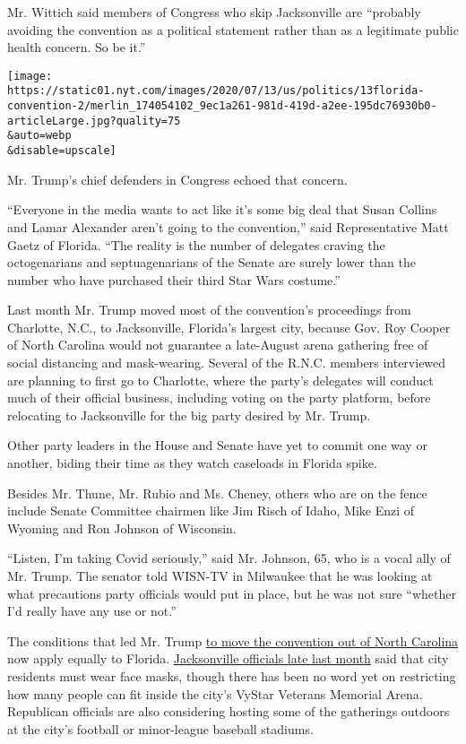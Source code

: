 Mr. Wittich said members of Congress who skip Jacksonville are
``probably avoiding the convention as a political statement rather than
as a legitimate public health concern. So be it.''

\texttt{[image: https://static01.nyt.com/images/2020/07/13/us/politics/13florida-convention-2/merlin\_174054102\_9ec1a261-981d-419d-a2ee-195dc76930b0-articleLarge.jpg?quality=75\\\&auto=webp\\\&disable=upscale]}

Mr. Trump's chief defenders in Congress echoed that concern.

``Everyone in the media wants to act like it's some big deal that Susan
Collins and Lamar Alexander aren't going to the convention,'' said
Representative Matt Gaetz of Florida. ``The reality is the number of
delegates craving the octogenarians and septuagenarians of the Senate
are surely lower than the number who have purchased their third Star
Wars costume.''

Last month Mr. Trump moved most of the convention's proceedings from
Charlotte, N.C., to Jacksonville, Florida's largest city, because Gov.
Roy Cooper of North Carolina would not guarantee a late-August arena
gathering free of social distancing and mask-wearing. Several of the
R.N.C. members interviewed are planning to first go to Charlotte, where
the party's delegates will conduct much of their official business,
including voting on the party platform, before relocating to
Jacksonville for the big party desired by Mr. Trump.

Other party leaders in the House and Senate have yet to commit one way
or another, biding their time as they watch caseloads in Florida spike.

Besides Mr. Thune, Mr. Rubio and Ms. Cheney, others who are on the fence
include Senate Committee chairmen like Jim Risch of Idaho, Mike Enzi of
Wyoming and Ron Johnson of Wisconsin.

``Listen, I'm taking Covid seriously,'' said Mr. Johnson, 65, who is a
vocal ally of Mr. Trump. The senator told WISN-TV in Milwaukee that he
was looking at what precautions party officials would put in place, but
he was not sure ``whether I'd really have any use or not.''

The conditions that led Mr. Trump
\href{https://www.nytimes.com/2020/06/11/us/politics/trump-jacksonville-rnc-speech.html}{to
move the convention out of North Carolina} now apply equally to Florida.
\href{https://www.nytimes.com/2020/06/29/us/politics/rnc-masks-convention.html}{Jacksonville
officials late last month} said that city residents must wear face
masks, though there has been no word yet on restricting how many people
can fit inside the city's VyStar Veterans Memorial Arena. Republican
officials are also considering hosting some of the gatherings outdoors
at the city's football or minor-league baseball stadiums.

